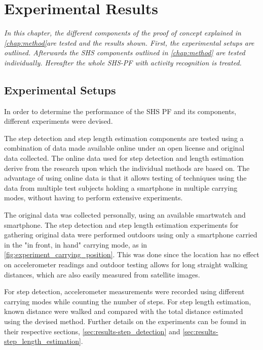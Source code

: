 \chapter{Experimental Results}

\textit{In this chapter, the  different components of the proof of concept explained in \cref{chap:method}are tested and the results shown. First, the  experimental setups are outlined. Afterwards the \ac{SHS} components outlined in \cref{chap:method} are tested individually. Hereafter the whole SHS-PF with activity recognition is treated.}

\section{Experimental Setups}
\label{sec:results-experimental setup}
In order to determine the performance of the \ac{SHS} \ac{PF} and its components, different experiments were devised. \par 

The step detection and step length estimation components are tested using a combination of data made available online under an open license and original data collected. The online data used for step detection and length estimation derive from the research upon which the individual methods are based on. The advantage of using online data is that it allows testing of techniques using the data from multiple test subjects holding a smartphone in multiple carrying modes, without having to perform extensive experiments.  \par 

The original data was collected personally, using an available smartwatch and smartphone. The step detection and step length estimation experiments for gathering original data  were performed outdoors using only a smartphone carried in the "in front, in hand" carrying mode, as in \cref{fig:experiment_carrying_position}. This was done since the location has no effect on accelerometer readings and outdoor testing allows for long straight walking distances, which are also easily measured from satellite images.\par 

For step detection, accelerometer measurements were recorded using different carrying modes while counting the number of steps. For step length estimation, known distance were walked and compared with the total distance estimated using the devised method. Further details on the experiments can be found in their respective sections, \cref{sec:results-step_detection} and \cref{sec:results-step_length_estimation}.    \par

